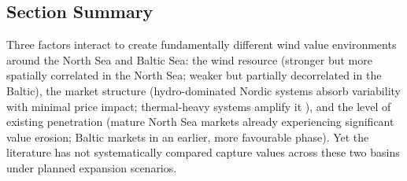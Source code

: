 \subsection{Section Summary}\label{sec:regional_summary}

Three factors interact to create fundamentally different wind value environments around the North Sea and Baltic Sea: the wind resource (stronger but more spatially correlated in the North Sea; weaker but partially decorrelated in the Baltic), the market structure (hydro-dominated Nordic systems absorb variability with minimal price impact; thermal-heavy systems amplify it \cite{Hirth2013, Keppler2016}), and the level of existing penetration (mature North Sea markets already experiencing significant value erosion; Baltic markets in an earlier, more favourable phase). Yet the literature has not systematically compared capture values across these two basins under planned expansion scenarios.
